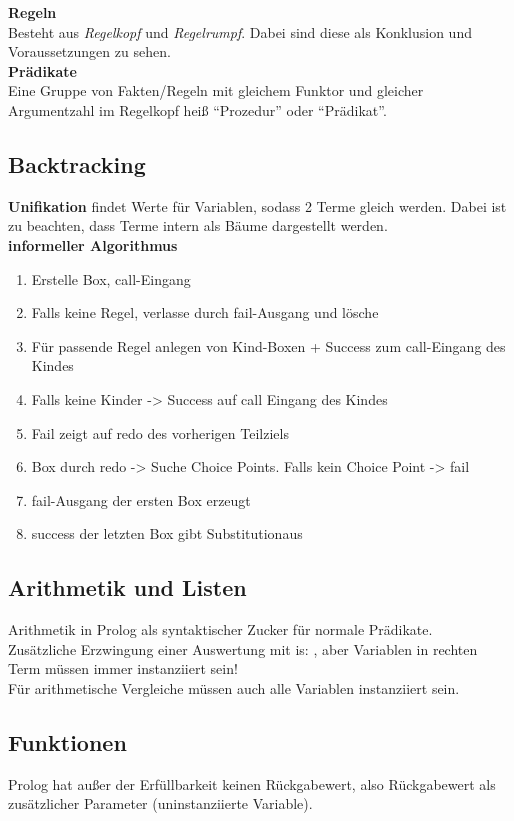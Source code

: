 \textbf{Regeln}\\
Besteht aus \textit{Regelkopf} und \textit{Regelrumpf}. Dabei sind diese als Konklusion und Voraussetzungen zu sehen.
\\

\textbf{Prädikate}\\
Eine Gruppe von Fakten/Regeln mit gleichem Funktor und gleicher Argumentzahl im Regelkopf heiß \enquote{Prozedur}
oder \enquote{Prädikat}.

\subsection{Backtracking}
\textbf{Unifikation} findet Werte für Variablen, sodass 2 Terme gleich werden. Dabei ist zu beachten, dass Terme intern
als Bäume dargestellt werden.\\
\textbf{informeller Algorithmus}
\begin{enumerate}
  \item Erstelle Box, call-Eingang
  \item Falls keine Regel, verlasse durch fail-Ausgang und lösche
  \item Für passende Regel anlegen von Kind-Boxen + Success zum call-Eingang des Kindes
  \item Falls keine Kinder -> Success auf call Eingang des Kindes
  \item Fail zeigt auf redo des vorherigen Teilziels
  \item Box durch redo -> Suche Choice Points. Falls kein Choice Point -> fail
  \item fail-Ausgang der ersten Box erzeugt 
  \item success der letzten Box gibt Substitutionaus
\end{enumerate}

\subsection{Arithmetik und Listen}
Arithmetik in Prolog als syntaktischer Zucker für normale Prädikate.\\
Zusätzliche Erzwingung einer Auswertung mit is: , aber Variablen
in rechten Term müssen immer instanziiert sein!\\
Für arithmetische Vergleiche müssen auch alle Variablen instanziiert sein.

\subsection{Funktionen}
Prolog hat außer der Erfüllbarkeit keinen Rückgabewert, also Rückgabewert als zusätzlicher Parameter (uninstanziierte Variable).

